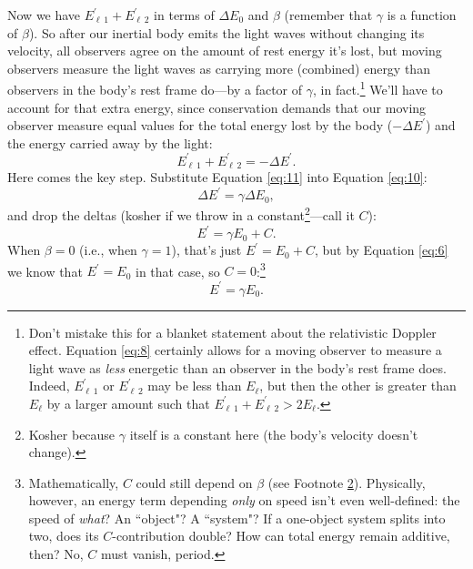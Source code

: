 \documentclass[12pt]{article}
\begin{document}
Now we have $E_{\ell \, 1}^{\prime} + E_{\ell \, 2}^{\prime}$ in terms of $\Delta E_0$ and $\beta$ (remember that $\gamma$ is a function of $\beta$). So after our inertial body emits the light waves without changing its velocity, all observers agree on the amount of rest energy it's lost, but moving observers measure the light waves as carrying more (combined) energy than observers in the body's rest frame do---by a factor of $\gamma$, in fact.\footnote{Don't mistake this for a blanket statement about the relativistic Doppler effect. Equation \ref{eq:8} certainly allows for a moving observer to measure a light wave as \emph{less} energetic than an observer in the body's rest frame does. Indeed, $E_{\ell \, 1}^\prime$ or $E_{\ell \, 2}^\prime$ may be less than $E_{\ell}$, but then the other is greater than $E_{\ell}$ by a larger amount such that $E_{\ell \, 1}^{\prime} + E_{\ell \, 2}^{\prime} > 2E_{\ell}$.} We'll have to account for that extra energy, since conservation demands that our moving observer measure equal values for the total energy lost by the body ($-\Delta E^{\prime}$) and the energy carried away by the light:
\begin{equation}\label{eq:11}
E_{\ell \, 1}^{\prime} + E_{\ell \, 2}^{\prime}=-\Delta E^{\prime}.
\end{equation}
Here comes the key step. Substitute Equation \ref{eq:11} into Equation \ref{eq:10}:
\begin{equation*}
\Delta E^{\prime} = \gamma \Delta E_0,
\end{equation*}
and drop the deltas (kosher if we throw in a constant\footnote{\label{fn:gammacaveat}Kosher because $\gamma$ itself is a constant here (the body's velocity doesn't change).}---call it $C$):
\begin{equation*}
E^{\prime} = \gamma E_0 + C.
\end{equation*}
When $\beta = 0$ (i.e., when $\gamma = 1$), that's just $E^{\prime} = E_0 + C$, but by Equation \ref{eq:6} we know that $E^{\prime} = E_0$ in that case, so $C=0$:\footnote{Mathematically, $C$ could still depend on $\beta$ (see Footnote \ref{fn:gammacaveat}). Physically, however, an energy term depending \emph{only} on speed isn't even well-defined: the speed of \emph{what}? An ``object"? A ``system"? If a one-object system splits into two, does its $C$-contribution double? How can total energy remain additive, then? No, $C$ must vanish, period.}
\begin{equation*}
E^{\prime} = \gamma E_0.
\end{equation*}
\end{document}
